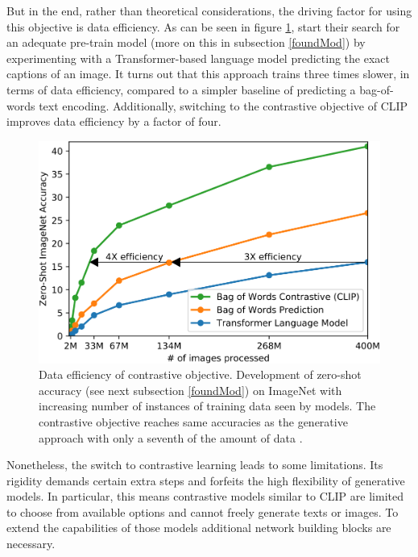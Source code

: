 \documentclass[
]{krantz}
\begin{document}
But in the end, rather than theoretical considerations, the driving factor for using this objective is data efficiency.
As can be seen in figure \ref{fig:data-efficiency}, \citet{radford2021learning} start their search for an adequate pre-train model (more on this in subsection \ref{foundMod}) by experimenting with a Transformer-based language model predicting the exact captions of an image.
It turns out that this approach trains three times slower, in terms of data efficiency, compared to a simpler baseline of predicting a bag-of-words text encoding.
Additionally, switching to the contrastive objective of CLIP improves data efficiency by a factor of four.

\begin{figure}

{\centering \includegraphics[width=1\linewidth]{figures/02-04-text-support-img/data-efficiency} 

}

\caption{Data efficiency of contrastive objective. Development of zero-shot accuracy (see next subsection \ref{foundMod}) on ImageNet with increasing number of instances of training data seen by models. The contrastive objective reaches same accuracies as the generative approach with only a seventh of the amount of data \citep{radford2021learning}.}\label{fig:data-efficiency}
\end{figure}



Nonetheless, the switch to contrastive learning leads to some limitations.
Its rigidity demands certain extra steps and forfeits the high flexibility of generative models.
In particular, this means contrastive models similar to CLIP are limited to choose from available options and cannot freely generate texts or images.
To extend the capabilities of those models additional network building blocks are necessary.
\end{document}
